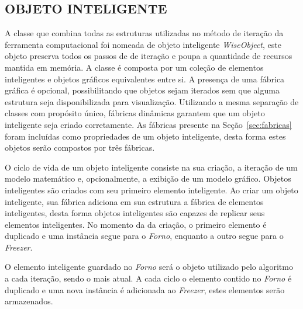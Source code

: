 \documentclass[a4paper,12pt]{monografia}
\theoremstyle{plain}
\theoremstyle{definition}
\theoremstyle{remark}
\begin{document}
\subsection{OBJETO INTELIGENTE}\label{sec:objeto_inteligente}

A classe que combina todas as estruturas utilizadas no método de iteração da ferramenta computacional foi nomeada de objeto inteligente \textit{WiseObject}, este objeto preserva todos os passos de de iteração e poupa a quantidade de recursos mantida em memória. A classe é composta por um coleção de elementos inteligentes e objetos gráficos equivalentes entre si. A presença de uma fábrica gráfica é opcional, possibilitando que objetos sejam iterados sem que alguma estrutura seja disponibilizada para visualização. Utilizando a mesma separação de classes com propósito único, fábricas dinâmicas garantem que um objeto inteligente seja criado corretamente. As fábricas presente na Seção~\ref{sec:fabricas} foram incluídas como propriedades de um objeto inteligente, desta forma estes objetos serão compostos por três fábricas.

O ciclo de vida de um objeto inteligente consiste na sua criação, a iteração de um modelo matemático e, opcionalmente, a exibição de um modelo gráfico. Objetos inteligentes são criados com seu primeiro elemento inteligente. Ao criar um objeto inteligente, sua fábrica adiciona em sua estrutura a fábrica de elementos inteligentes, desta forma objetos inteligentes são capazes de replicar seus elementos inteligentes. No momento da da criação, o primeiro elemento é duplicado e uma instância segue para o \textit{Forno}, enquanto a outro segue para o \textit{Freezer}.

O elemento inteligente guardado no \textit{Forno} será o objeto utilizado pelo algoritmo a cada iteração, sendo o mais atual. A cada ciclo o elemento contido no \textit{Forno} é duplicado e uma nova instância é adicionada ao \textit{Freezer}, estes elementos serão armazenados.
\end{document}
